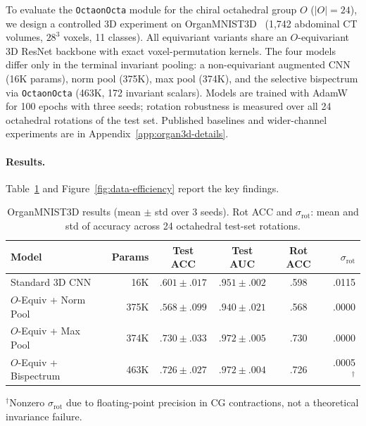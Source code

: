 \documentclass{article}
\theoremstyle{definition}
\theoremstyle{remark}
\theoremstyle{definition}
\begin{document}
To evaluate the \texttt{OctaonOcta} module for the chiral octahedral group
$O$ ($|O|=24$), we design a controlled 3D experiment on
OrganMNIST3D~\citep{medmnistv2} (1{,}742 abdominal CT volumes, $28^3$
voxels, 11 classes). All equivariant variants share an $O$-equivariant 3D
ResNet backbone with exact voxel-permutation kernels. The four models differ
only in the terminal invariant pooling: a non-equivariant augmented CNN
(16K params), norm pool (375K), max pool (374K), and the selective
bispectrum via \texttt{OctaonOcta} (463K, 172 invariant scalars). Models
are trained with AdamW~\citep{loshchilov2019adamw} for 100 epochs with
three seeds; rotation robustness is measured over all 24 octahedral
rotations of the test set. Published baselines and wider-channel experiments
are in Appendix~\ref{app:organ3d-details}.

\paragraph{Results.}
Table~\ref{tab:organ3d-results} and Figure~\ref{fig:data-efficiency} report
the key findings.

\begin{table}[t]
  \caption{OrganMNIST3D results (mean $\pm$ std over 3 seeds). Rot ACC and
    $\sigma_{\mathrm{rot}}$: mean and std of accuracy across 24 octahedral
    test-set rotations.}
  \label{tab:organ3d-results}
  \centering
  \small
  \begin{tabular}{lrcccr}
    \toprule
    Model & Params & Test ACC & Test AUC & Rot ACC & $\sigma_{\mathrm{rot}}$ \\
    \midrule
    Standard 3D CNN          & 16K  & $.601 \pm .017$ & $.951 \pm .002$ & .598 & .0115 \\
    $O$-Equiv + Norm Pool    & 375K & $.568 \pm .099$ & $.940 \pm .021$ & .568 & .0000 \\
    $O$-Equiv + Max Pool     & 374K & $.730 \pm .033$ & $.972 \pm .005$ & .730 & .0000 \\
    $O$-Equiv + Bispectrum   & 463K & $.726 \pm .027$ & $.972 \pm .004$ & .726 & .0005$^\dagger$ \\
    \bottomrule
  \end{tabular}

  \vspace{0.3em}
  {\small $^\dagger$Nonzero $\sigma_{\mathrm{rot}}$ due to floating-point precision in CG contractions, not a theoretical invariance failure.}
\end{table}
\end{document}
